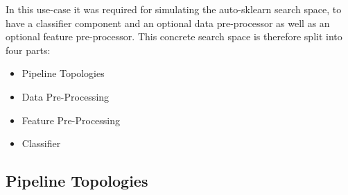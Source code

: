 In this use-case it was required for simulating the auto-sklearn search space, to have a classifier component and an optional data pre-processor as well as an optional feature pre-processor.
This concrete search space is therefore split into four parts:
\begin{itemize}
    \item Pipeline Topologies
    \item Data Pre-Processing
    \item Feature Pre-Processing
    \item Classifier
\end{itemize}

\subsection{Pipeline Topologies}
